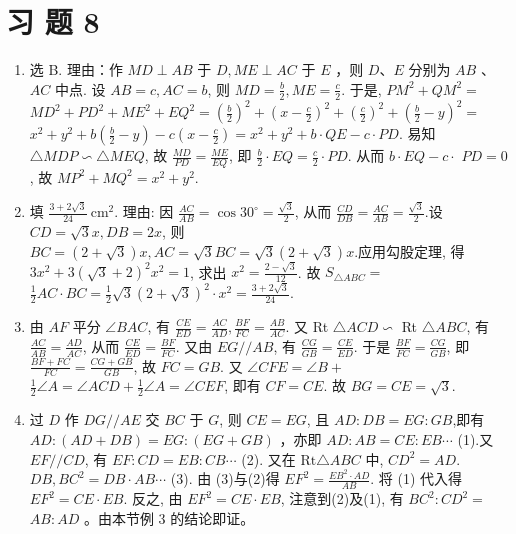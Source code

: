 \documentclass[10pt]{article}
\begin{document}
\section*{习 题 8}
\begin{enumerate}
  \item 选 B. 理由：作 $M D \perp A B$ 于 $D, M E \perp A C$ 于 $E$ ，则 $D 、 E$ 分别为 $A B$ 、 $A C$ 中点. 设 $A B=c, A C=b$, 则 $M D=\frac{b}{2}, M E=\frac{c}{2}$. 于是, $P M^{2}+Q M^{2}=$ $M D^{2}+P D^{2}+M E^{2}+E Q^{2}=\left(\frac{b}{2}\right)^{2}+\left(x-\frac{c}{2}\right)^{2}+\left(\frac{c}{2}\right)^{2}+\left(\frac{b}{2}-y\right)^{2}=$ $x^{2}+y^{2}+b\left(\frac{b}{2}-y\right)-c\left(x-\frac{c}{2}\right)=x^{2}+y^{2}+b \cdot Q E-c \cdot P D$. 易知 $\triangle M D P \backsim \triangle M E Q$, 故 $\frac{M D}{P D}=\frac{M E}{E Q}$, 即 $\frac{b}{2} \cdot E Q=\frac{c}{2} \cdot P D$. 从而 $b \cdot E Q-c \cdot$ $P D=0$, 故 $M P^{2}+M Q^{2}=x^{2}+y^{2}$.
  \item 填 $\frac{3+2 \sqrt{3}}{24} \mathrm{~cm}^{2}$. 理由: 因 $\frac{A C}{A B}=\cos 30^{\circ}=\frac{\sqrt{3}}{2}$, 从而 $\frac{C D}{D B}=\frac{A C}{A B}=\frac{\sqrt{3}}{2}$.设 $C D=\sqrt{3} x, D B=2 x$, 则 $B C=(2+\sqrt{3}) x, A C=\sqrt{3} B C=\sqrt{3}(2+\sqrt{3}) x$.应用勾股定理, 得 $3 x^{2}+3(\sqrt{3}+2)^{2} x^{2}=1$, 求出 $x^{2}=\frac{2-\sqrt{3}}{12}$. 故 $S_{\triangle A B C}=$ $\frac{1}{2} A C \cdot B C=\frac{1}{2} \sqrt{3}(2+\sqrt{3})^{2} \cdot x^{2}=\frac{3+2 \sqrt{3}}{24}$.
  \item 由 $A F$ 平分 $\angle B A C$, 有 $\frac{C E}{E D}=\frac{A C}{A D}, \frac{B F}{F C}=\frac{A B}{A C}$. 又 Rt $\triangle A C D \backsim$ Rt $\triangle A B C$, 有 $\frac{A C}{A B}=\frac{A D}{A C}$, 从而 $\frac{C E}{E D}=\frac{B F}{F C}$. 又由 $E G / / A B$, 有 $\frac{C G}{G B}=\frac{C E}{E D}$. 于是 $\frac{B F}{F C}=\frac{C G}{G B}$, 即 $\frac{B F+F C}{F C}=\frac{C G+G B}{G B}$, 故 $F C=G B$. 又 $\angle C F E=\angle B+$ $\frac{1}{2} \angle A=\angle A C D+\frac{1}{2} \angle A=\angle C E F$, 即有 $C F=C E$. 故 $B G=C E=\sqrt{3}$.
  \item 过 $D$ 作 $D G / / A E$ 交 $B C$ 于 $G$, 则 $C E=E G$, 且 $A D: D B=E G: G B$,即有 $A D:(A D+D B)=E G:(E G+G B)$ ，亦即 $A D: A B=C E: E B \cdots$ (1).又 $E F / / C D$, 有 $E F: C D=E B: C B \cdots$ (2). 又在 $\mathrm{Rt} \triangle A B C$ 中, $C D^{2}=A D$.\\
$D B, B C^{2}=D B \cdot A B \cdots$ (3). 由 (3)与(2)得 $E F^{2}=\frac{E B^{2} \cdot A D}{A B}$. 将 (1) 代入得 $E F^{2}=C E \cdot E B$. 反之, 由 $E F^{2}=C E \cdot E B$, 注意到(2)及(1), 有 $B C^{2}: C D^{2}=$ $A B: A D$ 。由本节例 3 的结论即证。

\end{enumerate}
\end{document}
